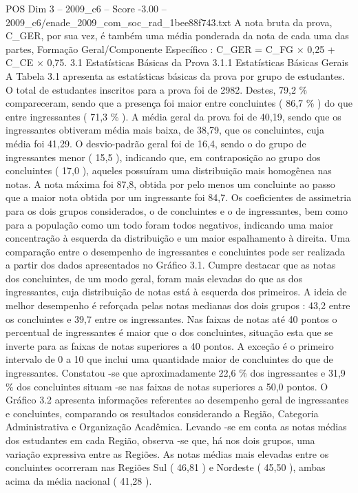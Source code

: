 \begin{textsample}{POS Dim 3 – 2009\_c6 – Score -3.00 – 2009\_c6/enade\_2009\_com\_soc\_rad\_1bee88f743.txt}
A nota bruta da prova, C\_GER, por sua vez, é também uma média ponderada da nota de cada uma das partes, Formação Geral/Componente Específico : C\_GER = C\_FG × 0,25 + C\_CE × 0,75. 3.1 Estatísticas Básicas da Prova 3.1.1 Estatísticas Básicas Gerais A Tabela 3.1 apresenta as estatísticas básicas da prova por grupo de estudantes.
O total de estudantes inscritos para a prova foi de 2982.
Destes, 79,2 \% compareceram, sendo que a presença foi maior entre concluintes ( 86,7 \% ) do que entre ingressantes ( 71,3 \% ).
A média geral da prova foi de 40,19, sendo que os ingressantes obtiveram média mais baixa, de 38,79, que os concluintes, cuja média foi 41,29.
O desvio-padrão geral foi de 16,4, sendo o do grupo de ingressantes menor ( 15,5 ), indicando que, em contraposição ao grupo dos concluintes ( 17,0 ), aqueles possuíram uma distribuição mais homogênea nas notas.
A nota máxima foi 87,8, obtida por pelo menos um concluinte ao passo que a maior nota obtida por um ingressante foi 84,7.
Os coeficientes de assimetria para os dois grupos considerados, o de concluintes e o de ingressantes, bem como para a população como um todo foram todos negativos, indicando uma maior concentração à esquerda da distribuição e um maior espalhamento à direita.
Uma comparação entre o desempenho de ingressantes e concluintes pode ser realizada a partir dos dados apresentados no Gráfico 3.1.
Cumpre destacar que as notas dos concluintes, de um modo geral, foram mais elevadas do que as dos ingressantes, cuja distribuição de notas está à esquerda dos primeiros.
A ideia de melhor desempenho é reforçada pelas notas medianas dos dois grupos : 43,2 entre os concluintes e 39,7 entre os ingressantes.
Nas faixas de notas até 40 pontos o percentual de ingressantes é maior que o dos concluintes, situação esta que se inverte para as faixas de notas superiores a 40 pontos.
A exceção é o primeiro intervalo de 0 a 10 que inclui uma quantidade maior de concluintes do que de ingressantes.
Constatou -se que aproximadamente 22,6 \% dos ingressantes e 31,9 \% dos concluintes situam -se nas faixas de notas superiores a 50,0 pontos.
O Gráfico 3.2 apresenta informações referentes ao desempenho geral de ingressantes e concluintes, comparando os resultados considerando a Região, Categoria Administrativa e Organização Acadêmica.
Levando -se em conta as notas médias dos estudantes em cada Região, observa -se que, há nos dois grupos, uma variação expressiva entre as Regiões.
As notas médias mais elevadas entre os concluintes ocorreram nas Regiões Sul ( 46,81 ) e Nordeste ( 45,50 ), ambas acima da média nacional ( 41,28 ).

\end{textsample}
